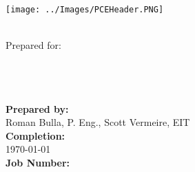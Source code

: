\begin{titlepage}
\thispagestyle{empty}
\center %

\begin{center}
\texttt{[image: ../Images/PCEHeader.PNG]}
\end{center}

\begin{center}
\vspace{20mm}
\Huge \DocTitle \\ %
\vspace{75mm}
\large Prepared for: \\
\LARGE\textbf{\Customer} \\
\large\textbf{\Target}\\
\small\textbf{\Address}\\
\end{center}



 
\begin{flushleft} \large
\vfill

\textbf{Prepared by:} \\
Roman Bulla, P. Eng., Scott Vermeire, EIT \\
\vspace{12pt} 
\textbf{Completion:}\\
\today \\ 
\vspace{12pt} 
\textbf{Job Number:}\\
\JobNum \\
\end{flushleft}

\end{titlepage}
